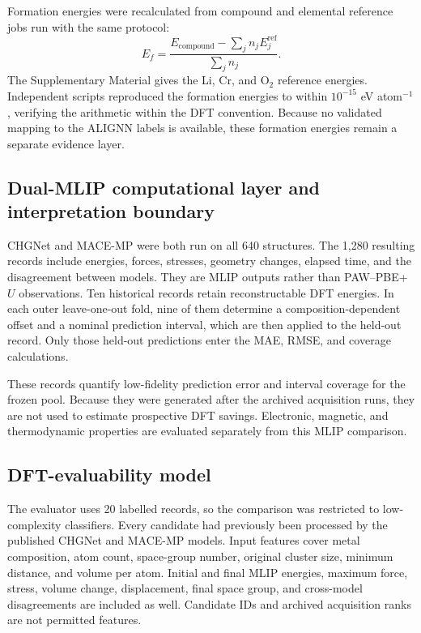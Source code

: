 Formation energies were recalculated from compound and elemental reference
jobs run with the same protocol:
\begin{equation}
E_f=
\frac{E_{\mathrm{compound}}-\sum_j n_jE_j^{\mathrm{ref}}}
{\sum_j n_j}.
\label{eq:dft-formation-energy}
\end{equation}
The Supplementary Material gives the Li, Cr, and O$_2$ reference energies.
Independent scripts reproduced the formation energies to within
$10^{-15}$ eV atom$^{-1}$, verifying the arithmetic within the DFT convention.
Because no validated mapping to the ALIGNN labels is available, these formation
energies remain a separate evidence layer.

\subsection{Dual-MLIP computational layer and interpretation boundary}

CHGNet and MACE-MP were both run on all 640 structures. The 1,280 resulting
records include energies, forces, stresses, geometry changes, elapsed time, and
the disagreement between models. They are MLIP outputs rather than
PAW--PBE+$U$ observations. Ten historical records retain reconstructable DFT
energies. In each outer leave-one-out fold, nine of them determine a
composition-dependent offset and a nominal prediction interval, which are then
applied to the held-out record. Only those held-out predictions enter the MAE,
RMSE, and coverage calculations.

These records quantify low-fidelity prediction error and interval coverage for
the frozen pool. Because they were generated after the archived acquisition
runs, they are not used to estimate prospective DFT savings. Electronic,
magnetic, and thermodynamic properties are evaluated separately from this MLIP
comparison.

\subsection{DFT-evaluability model}

The evaluator uses 20 labelled records, so the comparison was restricted to
low-complexity classifiers. Every candidate had previously been
processed by the published CHGNet \cite{ref-chgnet} and MACE-MP
\cite{ref-macemp} models. Input features cover metal composition, atom count,
space-group number, original cluster size, minimum distance, and volume per
atom. Initial and final MLIP energies, maximum force, stress, volume change,
displacement, final space group, and cross-model disagreements are included as
well. Candidate IDs and archived acquisition ranks are not permitted features.

